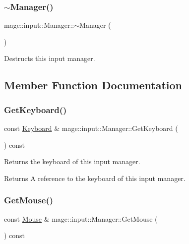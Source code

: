 \subsubsection{\texorpdfstring{$\sim$\+Manager()}{~Manager()}}
{\footnotesize\ttfamily mage\+::input\+::\+Manager\+::$\sim$\+Manager (\begin{DoxyParamCaption}{ }\end{DoxyParamCaption})\hspace{0.3cm}{\ttfamily [default]}}

Destructs this input manager. 

\subsection{Member Function Documentation}
\hypertarget{classmage_1_1input_1_1_manager_abd444400d2540d8cb4615cc7c47a72dd}{}\label{classmage_1_1input_1_1_manager_abd444400d2540d8cb4615cc7c47a72dd} 
\subsubsection{\texorpdfstring{Get\+Keyboard()}{GetKeyboard()}}
{\footnotesize\ttfamily const \hyperlink{classmage_1_1input_1_1_keyboard}{Keyboard} \& mage\+::input\+::\+Manager\+::\+Get\+Keyboard (\begin{DoxyParamCaption}{ }\end{DoxyParamCaption}) const\hspace{0.3cm}{\ttfamily [noexcept]}}

Returns the keyboard of this input manager.

\begin{DoxyReturn}{Returns}
A reference to the keyboard of this input manager. 
\end{DoxyReturn}
\hypertarget{classmage_1_1input_1_1_manager_a30cc36d7250842522b34a76e3f785f8a}{}\label{classmage_1_1input_1_1_manager_a30cc36d7250842522b34a76e3f785f8a} 
\subsubsection{\texorpdfstring{Get\+Mouse()}{GetMouse()}}
{\footnotesize\ttfamily const \hyperlink{classmage_1_1input_1_1_mouse}{Mouse} \& mage\+::input\+::\+Manager\+::\+Get\+Mouse (\begin{DoxyParamCaption}{ }\end{DoxyParamCaption}) const\hspace{0.3cm}{\ttfamily [noexcept]}}

